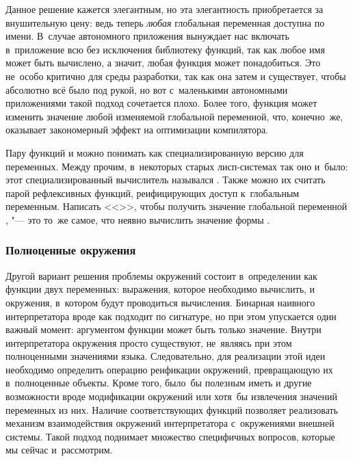 Данное решение кажется элегантным, но эта элегантность приобретается за
внушительную цену: ведь теперь \emph{любая} глобальная переменная доступна по
имени. В~случае автономного приложения  вынуждает нас включать
в~приложение всю без исключения библиотеку функций, так как любое имя может быть
вычислено, а значит, любая функция может понадобиться. Это не~особо критично для
среды разработки, так как она затем и существует, чтобы абсолютно всё было под
рукой, но вот с~маленькими автономными приложениями такой подход сочетается
плохо. Более того, функция  может изменить значение любой
изменяемой глобальной переменной, что, конечно~же, оказывает закономерный эффект
на оптимизации компилятора.

Пару функций  и  можно понимать как
специализированную версию  для переменных. Между прочим, в~некоторых
старых лисп-системах так оно и~было: этот специализированный вычислитель
назывался . Также можно их считать парой рефлексивных функций,
реифицирующих доступ к~глобальным переменным. Написать <<>>, чтобы
получить значение глобальной переменной , "--- это то~же самое, что
неявно вычислить значение формы .


\subsubsection{Полноценные окружения}%
\label{reflection/interpreted-eval/global/sssect:first-class}

Другой вариант решения проблемы окружений состоит в~определении  как
функции двух переменных: выражения, которое необходимо вычислить, и окружения,
в~котором будут проводиться вычисления. Бинарная  наивного
интерпретатора вроде как подходит по сигнатуре, но при этом упускается один
важный момент: аргументом функции может быть только значение. Внутри
интерпретатора окружения просто существуют, не~являясь при этом полноценными
значениями языка. Следовательно, для реализации этой идеи необходимо определить
операцию реификации окружений, превращающую их в~полноценные объекты. Кроме
того, было~бы полезным иметь и другие возможности вроде модификации окружений
или хотя~бы извлечения значений переменных из них. Наличие соответствующих
функций позволяет реализовать механизм взаимодействия окружений интерпретатора
с~окружениями внешней системы. Такой подход поднимает множество специфичных
вопросов, которые мы сейчас и~рассмотрим.


